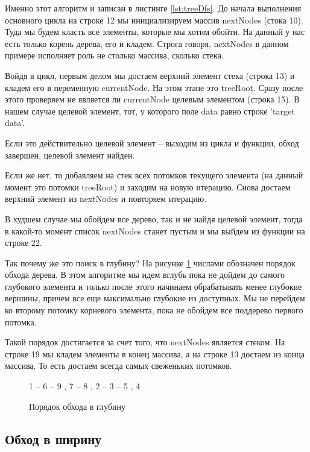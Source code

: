 \documentclass[../../article]{subfiles}
\begin{document}
Именно этот алгоритм и записан в листинге \ref{lst:treeDfs}. До начала выполнения основного цикла на строке 12 мы инициализируем массив {\firacodebold nextNodes} (стока 10). Туда мы будем класть все элементы, которые мы хотим обойти. На данный у нас есть только корень дерева, его и кладем. Строга говоря, {\firacodebold nextNodes} в данном примере исполняет роль не столько массива, сколько {\firacodebold стека}.

Войдя в цикл, первым делом мы достаем верхний элемент стека (строка 13) и кладем его в переменную {\firacodebold currentNode}. На этом этапе это {\firacodebold treeRoot}. Сразу после этого проверяем не является ли {\firacodebold currentNode} целевым элементом (строка 15). В нашем случае целевой элемент, тот, у которого поле {\firacodebold data} равно строке {\firacodebold 'target data'}.

Если это действительно целевой элемент – выходим из цикла и функции, обход завершен, целевой элемент найден.

Если же нет, то добавляем на стек всех потомков текущего элемента (на данный момент это потомки {\firacodebold treeRoot}) и заходим на новую итерацию. Снова достаем верхний элемент из {\firacodebold nextNodes} и повторяем итерацию.

В худшем случае мы обойдем все дерево, так и не найдя целевой элемент, тогда в какой-то момент список {\firacodebold nextNodes} станет пустым и мы выйдем из функции на строке 22.

Так почему же это поиск в глубину? На рисунке \ref{fig:treeDfsOrder} числами обозначен порядок обхода дерева. В этом алгоритме мы идем вглубь пока не дойдем до самого глубокого элемента и только после этого начинаем обрабатывать менее глубокие вершины, причем все еще максимально глубокие из доступных. Мы не перейдем ко второму потомку корневого элемента, пока не обойдем все поддерево первого потомка.

Такой порядок достигается за счет того, что {\firacodebold nextNodes} является стеком. На строке 19 мы кладем элементы в конец массива, а на строке 13 достаем из конца массива. То есть достаем всегда самых свеженьких потомков.

\begin{figure}
    \styledgraph
    {
        1 -- { 6 -- { 9 , 7 -- 8 }, 2 -- 3 -- { 5 , 4 }}
    }
    \caption{Порядок обхода в глубину}
    \label{fig:treeDfsOrder}
\end{figure}


\subsection{Обход в ширину}
\end{document}

